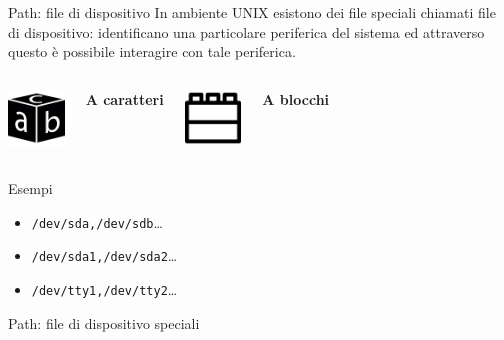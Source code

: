 \documentclass{beamer}
\begin{document}
    \begin{frame}{Path: file di dispositivo}
        In ambiente UNIX esistono dei file speciali chiamati file di dispositivo:
        identificano una particolare periferica del sistema ed attraverso questo è possibile interagire con tale periferica. \\
        \vspace{0.25cm}
        \begin{columns}[t, onlytextwidth]
                \centering
                \includegraphics[height=1.5cm, keepaspectratio]{images/char.pdf}
                
                \textbf{A caratteri}

                \centering
                \includegraphics[height=1.5cm, keepaspectratio]{images/block.pdf}
                
                \textbf{A blocchi}
        \end{columns}

        \vspace{0.25cm}

        \begin{exampleblock}{Esempi}
            \begin{itemize}
                \item \texttt{/dev/sda,/dev/sdb}\dots
                \item \texttt{/dev/sda1,/dev/sda2}\dots
                \item \texttt{/dev/tty1,/dev/tty2}\dots
            \end{itemize}
        \end{exampleblock}
    \end{frame}

    \begin{frame}{Path: file di dispositivo speciali}
    \end{frame}
\end{document}
